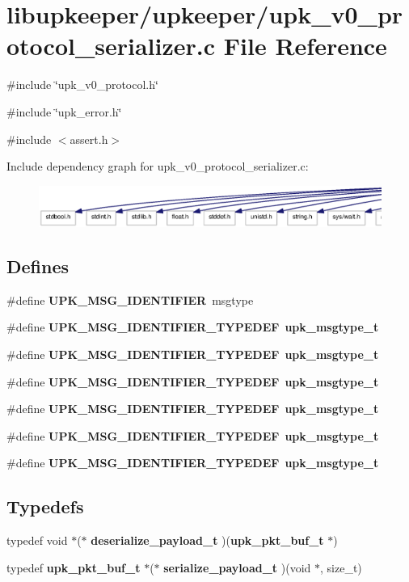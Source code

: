 \section{libupkeeper/upkeeper/upk\_\-v0\_\-protocol\_\-serializer.c File Reference}
\label{upk__v0__protocol__serializer_8c}
{\ttfamily \#include \char`\"{}upk\_\-v0\_\-protocol.h\char`\"{}}\par
{\ttfamily \#include \char`\"{}upk\_\-error.h\char`\"{}}\par
{\ttfamily \#include $<$assert.h$>$}\par
Include dependency graph for upk\_\-v0\_\-protocol\_\-serializer.c:
\nopagebreak
\begin{figure}[H]
\begin{center}
\leavevmode
\includegraphics[width=400pt]{upk__v0__protocol__serializer_8c__incl}
\end{center}
\end{figure}
\subsection*{Defines}
\begin{DoxyCompactItemize}
\item 
\#define {\bf UPK\_\-MSG\_\-IDENTIFIER}~msgtype
\item 
\#define {\bf UPK\_\-MSG\_\-IDENTIFIER\_\-TYPEDEF}~{\bf upk\_\-msgtype\_\-t}
\item 
\#define {\bf UPK\_\-MSG\_\-IDENTIFIER\_\-TYPEDEF}~{\bf upk\_\-msgtype\_\-t}
\item 
\#define {\bf UPK\_\-MSG\_\-IDENTIFIER\_\-TYPEDEF}~{\bf upk\_\-msgtype\_\-t}
\item 
\#define {\bf UPK\_\-MSG\_\-IDENTIFIER\_\-TYPEDEF}~{\bf upk\_\-msgtype\_\-t}
\item 
\#define {\bf UPK\_\-MSG\_\-IDENTIFIER\_\-TYPEDEF}~{\bf upk\_\-msgtype\_\-t}
\item 
\#define {\bf UPK\_\-MSG\_\-IDENTIFIER\_\-TYPEDEF}~{\bf upk\_\-msgtype\_\-t}
\end{DoxyCompactItemize}
\subsection*{Typedefs}
\begin{DoxyCompactItemize}
\item 
typedef void $\ast$($\ast$ {\bf deserialize\_\-payload\_\-t} )({\bf upk\_\-pkt\_\-buf\_\-t} $\ast$)
\item 
typedef {\bf upk\_\-pkt\_\-buf\_\-t} $\ast$($\ast$ {\bf serialize\_\-payload\_\-t} )(void $\ast$, size\_\-t)
\end{DoxyCompactItemize}
